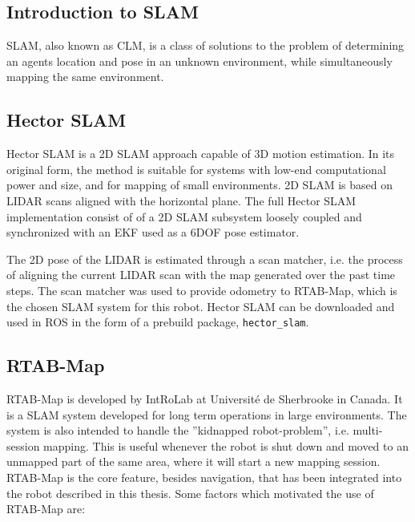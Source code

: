 \subsection{Introduction to SLAM}

\ac{SLAM}, also known as \ac{CLM}, is a class of solutions to the problem of determining an agents location and pose in an unknown environment, while simultaneously mapping the same environment.

\subsection{Hector SLAM}
\label{sec:hector}
Hector SLAM \cite{KohlbrecherMeyerStrykKlingaufFlexibleSlamSystem2011} is a 2D \ac{SLAM} approach capable of 3D motion estimation. In its original form, the method is suitable for systems with low-end computational power and size, and for mapping of small environments. 2D \ac{SLAM} is based on \ac{LIDAR} scans aligned with the horizontal plane. The full Hector SLAM implementation consist of of a 2D \ac{SLAM} subsystem loosely coupled and synchronized with an \ac{EKF} used as a  6DOF pose estimator. 

The 2D pose of the \ac{LIDAR} is estimated through a scan matcher, i.e. the process of aligning the current \ac{LIDAR} scan with the map generated over the past time steps. The scan matcher was used to provide odometry to \ac{RTAB-Map}, which is the chosen \ac{SLAM} system for this robot. Hector SLAM can be downloaded and used in \ac{ROS} in the form of a prebuild package, \texttt{hector\_slam}.  

\subsection{RTAB-Map}
\label{sec:RTAB-Map}

\ac{RTAB-Map} is developed by IntRoLab at Université de Sherbrooke in Canada. It is a \ac{SLAM} system developed for long term operations in large environments. The system is also intended to handle the ''kidnapped robot-problem'', i.e. multi-session mapping. This is useful whenever the robot is shut down and moved to an unmapped part of the same area, where it will start a new mapping session. \ac{RTAB-Map} is the core feature, besides navigation, that has been integrated into the robot described in this thesis. Some factors which motivated the use of \ac{RTAB-Map} are:

